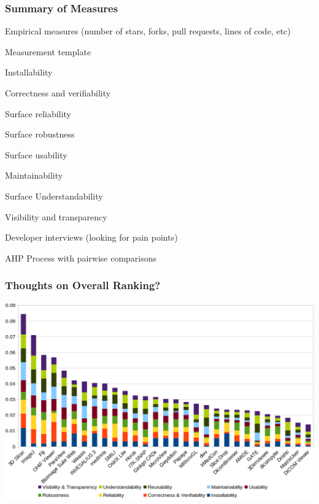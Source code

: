 \documentclass[t,12pt,numbers,fleqn]{beamer}
\begin{document}

\begin{frame}
\frametitle{Summary of Measures}

\bi
\item Empirical measures (number of stars, forks, pull requests, lines of code, etc)
\item Measurement template
  \bi
\item Installability
\item Correctness and verifiability
\item Surface reliability
\item Surface robustness
\item Surface usability
\item Maintainability
\item Surface Understandability
  \item Visibility and transparency
  \ei
\item Developer interviews (looking for pain points)
\item AHP Process with pairwise comparisons
  \ei
\end{frame}


\begin{frame}
\frametitle{Thoughts on Overall Ranking?}

\bigskip

    \includegraphics[width=1.0\textwidth]{overall_scores.png}

\end{frame}

\end{document}
